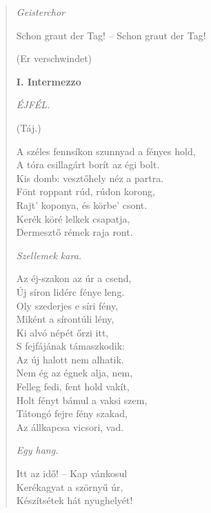 \begin{verse}
\smallskip

\textit{Geisterchor}

\smallskip

Schon graut der Tag! -- Schon graut der Tag! 

\smallskip

(Er verschwindet)

\smallskip


\bigskip

\textbf{I. Intermezzo}

\smallskip

\textit{ÉJFÉL.}

\smallskip

(Táj.)

\smallskip

A széles fennsíkon szunnyad a fényes hold, \\
A tóra csillagárt borít az égi bolt. \\
Kis domb: vesztőhely néz a partra. \\
Fönt roppant rúd, rúdon korong, \\
Rajt' koponya, és körbe' csont. \\
Kerék köré lelkek csapatja, \\
Dermesztő rémek raja ront. 

\smallskip

\textit{Szellemek kara.}

\smallskip

\frqq Az éj-szakon az úr a csend, \\
Új síron lidérc fénye leng. \\
Oly szederjes e síri fény, \\
Miként a sírontúli lény, \\
Ki alvó népét őrzi itt, \\
S fejfájának támaszkodik: \\
Az új halott nem alhatik. \\
Nem ég az égnek alja, nem, \\
Felleg fedi, fent hold vakít, \\
Holt fényt bámul a vaksi szem, \\
Tátongó fejre fény szakad, \\
Az állkapcsa vicsori, vad. \flqq

\smallskip

\textit{Egy hang.}

\smallskip

\frqq Itt az idő! -- Kap vánkosul \\
Kerékagyat a szörnyű úr, \\
Készítsétek hát nyughelyét! \flqq


\end{verse}
